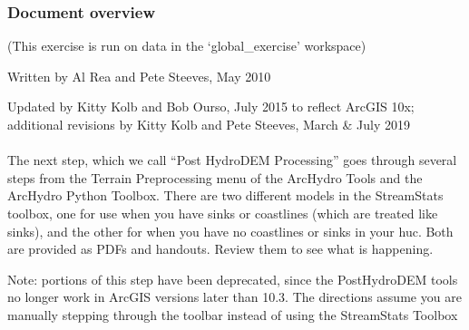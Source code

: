 \documentclass[letterpaper,10pt,english]{sphinxmanual}
\begin{document}
\subsubsection{Document overview}
\label{\detokenize{ex_2:document-overview}}
(This exercise is run on data in the ‘global\_exercise’ workspace)

Written by Al Rea and Pete Steeves, May 2010

Updated by Kitty Kolb and Bob Ourso, July 2015 to reflect ArcGIS 10x; additional revisions by Kitty Kolb and Pete Steeves, March \& July 2019


\paragraph{}
\label{\detokenize{ex_2:process-local-huc-archydro-geodatabases}}
The next step, which we call “Post HydroDEM Processing” goes through several steps from the Terrain Preprocessing menu of the ArcHydro Tools and the ArcHydro Python Toolbox. There are two different models in the StreamStats toolbox, one for use when you have sinks or coastlines (which are treated like sinks), and the other for when you have no coastlines or sinks in your huc. Both are provided as PDFs and handouts. Review them to see what is happening.

Note: portions of this step have been deprecated, since the PostHydroDEM tools no longer work in ArcGIS versions later than 10.3.  The directions assume you are manually stepping through the toolbar instead of using the StreamStats Toolbox
\end{document}

